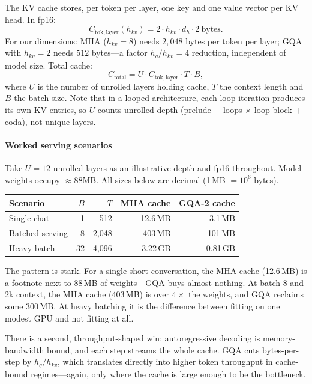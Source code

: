 The KV cache stores, per token per layer, one key and one value
vector per KV head. In fp16:
\begin{equation}
  C_{\mathrm{tok,layer}}(h_{kv}) = 2 \cdot h_{kv} \cdot d_h
  \cdot 2\ \mathrm{bytes}.
\end{equation}
For our dimensions: MHA ($h_{kv} = 8$) needs $2{,}048$ bytes per
token per layer; GQA with $h_{kv} = 2$ needs $512$ bytes---a factor
$h_q/h_{kv} = 4$ reduction, independent of model size. Total cache:
\begin{equation}
  C_{\mathrm{total}} = U \cdot C_{\mathrm{tok,layer}} \cdot T
  \cdot B,
\end{equation}
where $U$ is the number of unrolled layers holding cache, $T$ the
context length and $B$ the batch size. Note that in a looped
architecture, each loop iteration produces its own KV entries, so
$U$ counts unrolled depth (prelude $+$ loops $\times$ loop block
$+$ coda), not unique layers.

\paragraph{Worked serving scenarios}
\label{sec:scenarios}

Take $U = 12$ unrolled layers as an illustrative depth and fp16
throughout. Model weights occupy $\approx 88$MB. All sizes below are
decimal (1\,MB $= 10^6$ bytes).

\begin{center}
{\small\setlength{\tabcolsep}{4pt}
\begin{tabular}{lrrrr}
\toprule
Scenario & $B$ & $T$ & MHA cache & GQA-2 cache \\
\midrule
Single chat & 1 & 512 & 12.6\,MB & 3.1\,MB \\
Batched serving & 8 & 2{,}048 & 403\,MB & 101\,MB \\
Heavy batch & 32 & 4{,}096 & 3.22\,GB & 0.81\,GB \\
\bottomrule
\end{tabular}}
\end{center}

The pattern is stark. For a single short conversation, the MHA
cache (12.6\,MB) is a footnote next to 88\,MB of weights---GQA buys
almost nothing. At batch 8 and 2k context, the MHA cache
(403\,MB) is over $4\times$ the weights, and GQA reclaims some
300\,MB. At heavy batching it is the difference between fitting on
one modest GPU and not fitting at all.

There is a second, throughput-shaped win: autoregressive decoding
is memory-bandwidth bound, and each step streams the whole cache.
GQA cuts bytes-per-step by $h_q/h_{kv}$, which translates directly
into higher token throughput in cache-bound regimes---again, only
where the cache is large enough to be the bottleneck.

